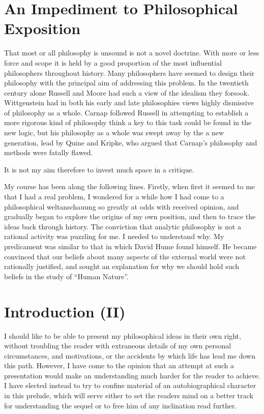 \section{An Impediment to Philosophical Exposition}

That most or all philosophy is unsound is not a novel doctrine.
With more or less force and scope it is held by a good proportion of the most influential philosophers throughout history.
Many philosophers have seemed to design their philosophy with the principal aim of addressing this problem.
In the twentieth century alone Russell and Moore had such a view of the idealism they forsook.
Wittgenstein had in both his early and late philosophies views highly dismissive of philosophy as a whole.
Carnap followed Russell in attempting to establish a more rigorous kind of philosophy think a key to this task could be found in the new logic, but his philosophy as a whole was swept away by the a new generation, lead by Quine and Kripke, who argued that Carnap's philosophy and methods were fatally flawed.

It is not my aim therefore to invest much space in a critique.

My course has been along the following lines.
Firstly, when first it seemed to me that I had a real problem, I wondered for a while how I had come to a philosophical weltanschauung so greatly at odds with received opinion, and gradually began to explore the origins of my own position, and then to trace the ideas back through history.
The conviction that analytic philosophy is not a rational activity was puzzling for me.
I needed to understand why.
My predicament was similar to that in which David Hume found himself.
He became convinced that our beliefs about many aspects of the external world were not rationally justified, and sought an explanation for why we should hold such beliefs in the study of ``Human Nature''.

\section{Introduction (II)}

I should like to be able to present my philosophical ideas in their own right, without troubling the reader with extraneous details of my own personal circumstances, and motivations, or the accidents by which life has lead me down this path.
However, I have come to the opinion that an attempt at such a presentation would make an understanding much harder for the reader to achieve.
I have elected instead to try to confine material of an autobiographical character in this prelude, which will serve either to set the readers mind on a better track for understanding the sequel or to free him of any inclination read further.

